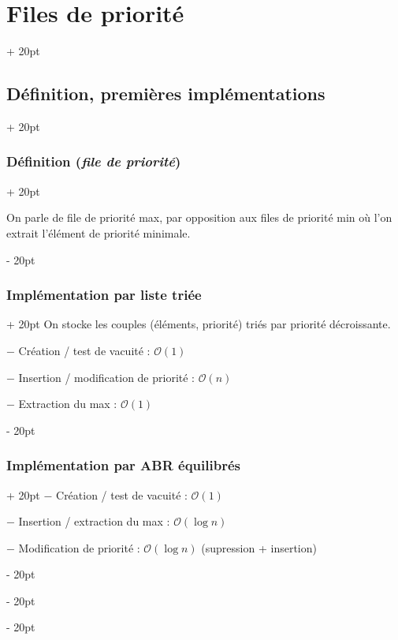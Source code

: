 \documentclass[a4paper, 12pt, twoside]{article}
\newcommand{\ind}[1][20pt]{\advance\leftskip + #1}
\newcommand{\deind}[1][20pt]{\advance\leftskip - #1}
\newenvironment{indt}[2][20pt]{#2 \par \ind[#1]}{\par \deind} %
\begin{document}
\begin{indt}{\section{Files de priorité}}
\begin{indt}{\subsection{Définition, premières implémentations}}
\begin{indt}{\subsubsection{Définition (\textit{file de priorité})}}
                
                \vspace{12pt}
                
                On parle de file de priorité max, par opposition aux files de priorité min où l'on extrait l'élément de priorité minimale.
            \end{indt}
            
            \vspace{12pt}
            
            \begin{indt}{\subsubsection{Implémentation par liste triée}}
                On stocke les couples (éléments, priorité) triés par priorité décroissante.
                
                $-$ Création / test de vacuité : $\mathcal O(1)$
                
                $-$ Insertion / modification de priorité : $\mathcal O(n)$
                
                $-$ Extraction du max : $\mathcal O(1)$
            \end{indt}
            
            \vspace{12pt}
            
            \begin{indt}{\subsubsection{Implémentation par ABR équilibrés}}
                $-$ Création / test de vacuité : $\mathcal O(1)$
                
                $-$ Insertion / extraction du max : $\mathcal O(\log n)$
                
                $-$ Modification de priorité : $\mathcal O(\log n)$ (supression + insertion)
            \end{indt}
            

\end{indt}
\end{indt}
\end{document}
